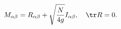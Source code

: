 \begin{equation}\label{shift}
    M_{\alpha\beta}=R_{\alpha\beta}+\sqrt{\dfrac{N}{4g}}I_{\alpha\beta},\quad
    \tr R=0.
\end{equation}

